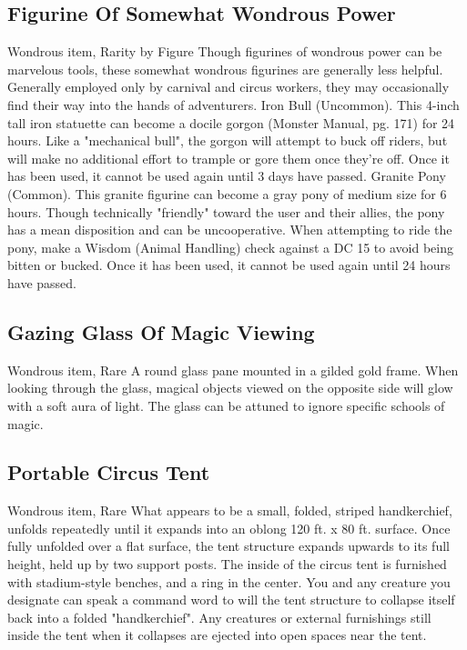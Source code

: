 \documentclass[10pt,a4paper,twoside,twocolumn,openany,bg=print,nodeprecatedcode]{dndbook}
\begin{document}
\subsection{Figurine Of Somewhat Wondrous Power}
Wondrous item, Rarity by Figure
Though figurines of wondrous power can be marvelous tools, these somewhat wondrous figurines are generally less helpful. Generally employed only by carnival and circus workers, they may occasionally find their way into the hands of adventurers.
Iron Bull (Uncommon). This 4-inch tall iron statuette can become a docile gorgon (Monster Manual, pg. 171) for 24 hours. Like a "mechanical bull", the gorgon will attempt to buck off riders, but will make no additional effort to trample or gore them once they're off. Once it has been used, it cannot be used again until 3 days have passed.
Granite Pony (Common). This granite figurine can become a gray pony of medium size for 6 hours. Though technically "friendly" toward the user and their allies, the pony has a mean disposition and can be uncooperative. When attempting to ride the pony, make a Wisdom (Animal Handling) check against a DC 15 to avoid being bitten or bucked. Once it has been used, it cannot be used again until 24 hours have passed.
\subsection{Gazing Glass Of Magic Viewing}
Wondrous item, Rare
A round glass pane mounted in a gilded gold frame. When looking through the glass, magical objects viewed on the opposite side will glow with a soft aura of light. The glass can be attuned to ignore specific schools of magic. 
\subsection{Portable Circus Tent}
Wondrous item, Rare
What appears to be a small, folded, striped handkerchief, unfolds repeatedly until it expands into an oblong 120 ft. x 80 ft. surface. Once fully unfolded over a flat surface, the tent structure expands upwards to its full height, held up by two support posts. The inside of the circus tent is furnished with stadium-style benches, and a ring in the center. You and any creature you designate can speak a command word to will the tent structure to collapse itself back into a folded "handkerchief". Any creatures or external furnishings still inside the tent when it collapses are ejected into open spaces near the tent.
\end{document}
